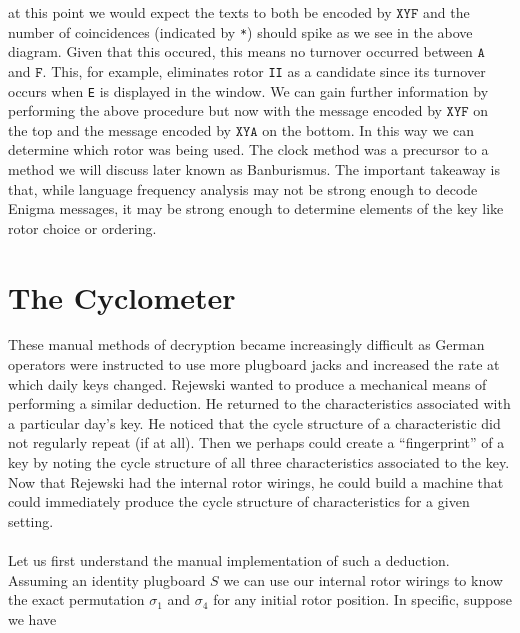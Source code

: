 at this point we would expect the texts to both be encoded by
$\texttt{XYF}$ and the number of coincidences (indicated by
\texttt{*}) should spike as we see in the above diagram. Given that
this occured, this means no turnover occurred between $\texttt{A}$ and
$\texttt{F}$. This, for example, eliminates rotor \texttt{II} as a
candidate since its turnover occurs when \texttt{E} is displayed in
the window. We can gain further information by performing the above
procedure but now with the message encoded by $\texttt{XYF}$ on the
top and the message encoded by $\texttt{XYA}$ on the bottom. In this
way we can determine which rotor was being used. The clock method was
a precursor to a method we will discuss later known as Banburismus.
The important takeaway is that, while language frequency analysis may not be
strong enough to decode Enigma messages, it may be strong enough to
determine elements of the key like rotor choice or ordering.

\section{The Cyclometer}

These manual methods of decryption became increasingly difficult as
German operators were instructed to use more plugboard jacks and
increased the rate at which daily keys changed. Rejewski wanted to
produce a mechanical means of performing a similar deduction. He
returned to the characteristics associated with a particular day's
key. He noticed that the cycle structure of a characteristic did not
regularly repeat (if at all). Then we perhaps could create a
``fingerprint'' of a key by noting the cycle structure of all three
characteristics associated to the key. Now that Rejewski had the
internal rotor wirings, he could build a machine that could
immediately produce the cycle structure of characteristics for a given setting.
\\\\Let us first understand the manual implementation of such a
deduction. Assuming an identity plugboard $S$ we can use our internal
rotor wirings to know the exact permutation $\sigma_1$ and
$\sigma_4$ for any initial rotor position. In specific, suppose we have

